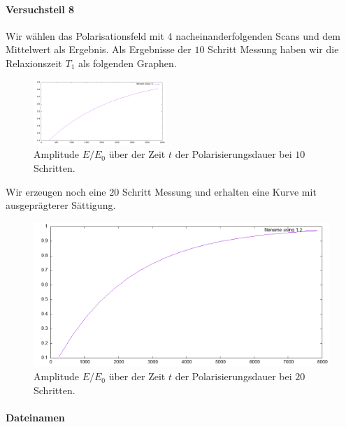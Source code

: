 \documentclass{subfiles}
\begin{document}
        \paragraph*{Versuchsteil 8}
            Wir wählen das Polarisationsfeld mit $4$ nacheinanderfolgenden Scans und dem Mittelwert als Ergebnis. 
            Als Ergebnisse der $10$ Schritt Messung haben wir die Relaxionszeit $T_1$ als folgenden Graphen.
            \begin{figure}[H]
                \centering
                \includegraphics[width=5cm]{Live-Dokumente/Bilder/B1-10steps/T1.png}
                \caption{Amplitude $E/E_0$ über der Zeit $t$ der Polarisierungsdauer bei $10$ Schritten.}
                \label{fig:T1}
            \end{figure}
            Wir erzeugen noch eine $20$ Schritt Messung und erhalten eine Kurve mit ausgeprägterer Sättigung.
            \begin{figure}
                \centering
                \includegraphics[options]{Live-Dokumente/Bilder/T1-20steps/T1.png}
                \caption{Amplitude $E/E_0$ über der Zeit $t$ der Polarisierungsdauer bei $20$ Schritten.}
                \label{fig:T1-20steps}
            \end{figure}

        \paragraph*{Dateinamen}
\end{document}
